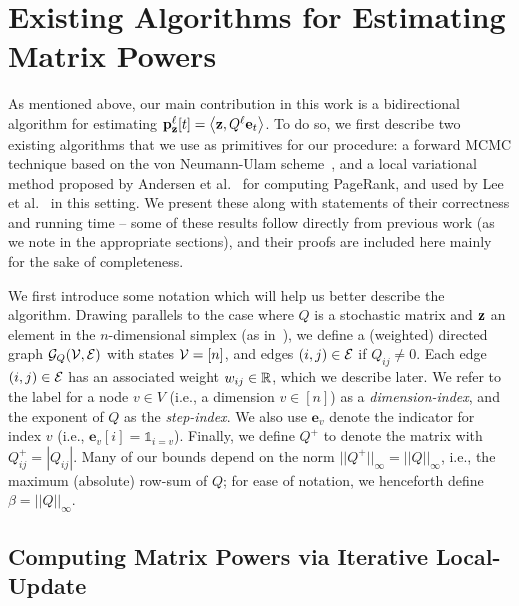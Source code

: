 \section{Existing Algorithms for Estimating Matrix Powers}
\label{sec:existing}

As mentioned above, our main contribution in this work is a bidirectional algorithm for estimating ${\mathbf{p}}_\mathbf{z}^{\ell}[t] =\left< \mathbf{z}, Q^{\ell}\mathbf{e}_t \right>$.
To do so, we first describe two existing algorithms that we use as primitives for our procedure: a forward MCMC technique based on the von Neumann-Ulam scheme~\cite{Wasow1952,ji2013convergence}, and a local variational method proposed by Andersen et al.~\cite{andersen2007local} for computing PageRank, and used by Lee et al.~\cite{lee2014asynchronous} in this setting. 
We present these along with statements of their correctness and running time -- some of these results follow directly from previous work (as we note in the appropriate sections), and their proofs are included here mainly for the sake of completeness.

We first introduce some notation which will help us better describe the algorithm.
Drawing parallels to the case where $Q$ is a stochastic matrix and $\mathbf{z}$ an element in the $n$-dimensional simplex (as in~\cite{banerjee2015fast}), we define a (weighted) directed graph ${\mathcal{G}}_Q({\mathcal{V}},{\mathcal{E}})$ with states ${\mathcal{V}} = [n]$, and edges $(i,j)\in {\mathcal{E}}$ if $Q_{ij}\neq 0$. 
Each edge $(i,j)\in{\mathcal{E}}$ has an associated weight $w_{ij}\in\mathbb{R}$, which we describe later.
We refer to the label for a node $v\in V$ (i.e., a dimension $v\in[n]$) as a \emph{dimension-index}, and the exponent of $Q$ as the \emph{step-index}.
We also use $\mathbf{e}_v$ denote the indicator for index $v$ (i.e., $\mathbf{e}_v[i] = \mathds{1}_{i=v}$). 
Finally, we define $Q^+$ to denote the matrix with $Q^+_{ij} = |Q_{ij}|$. 
Many of our bounds depend on the norm $||Q^+||_{\infty} = ||Q||_{\infty}$, i.e., the maximum (absolute) row-sum of $Q$; for ease of notation, we henceforth define $\beta = ||Q||_{\infty}$. 



\subsection{Computing Matrix Powers via Iterative Local-Update}
\label{ssec:reverse}

